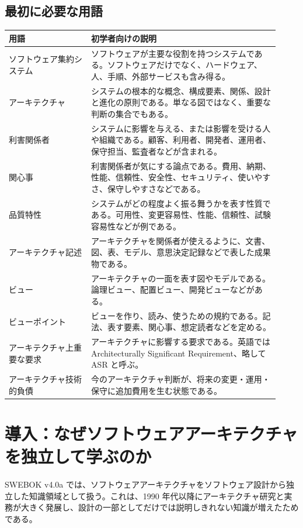 \documentclass[a4paper,11pt]{ltjsarticle}
\begin{document}
\subsection*{最初に必要な用語}
\begin{longtable}{P{0.28\linewidth}P{0.64\linewidth}}
\toprule
用語 & 初学者向けの説明 \\
\midrule
ソフトウェア集約システム & ソフトウェアが主要な役割を持つシステムである。ソフトウェアだけでなく、ハードウェア、人、手順、外部サービスも含み得る。 \\
アーキテクチャ & システムの根本的な概念、構成要素、関係、設計と進化の原則である。単なる図ではなく、重要な判断の集合でもある。 \\
利害関係者 & システムに影響を与える、または影響を受ける人や組織である。顧客、利用者、開発者、運用者、保守担当、監査者などが含まれる。 \\
関心事 & 利害関係者が気にする論点である。費用、納期、性能、信頼性、安全性、セキュリティ、使いやすさ、保守しやすさなどである。 \\
品質特性 & システムがどの程度よく振る舞うかを表す性質である。可用性、変更容易性、性能、信頼性、試験容易性などが例である。 \\
アーキテクチャ記述 & アーキテクチャを関係者が使えるように、文書、図、表、モデル、意思決定記録などで表した成果物である。 \\
ビュー & アーキテクチャの一面を表す図やモデルである。論理ビュー、配置ビュー、開発ビューなどがある。 \\
ビューポイント & ビューを作り、読み、使うための規約である。記法、表す要素、関心事、想定読者などを定める。 \\
アーキテクチャ上重要な要求 & アーキテクチャに影響する要求である。英語では Architecturally Significant Requirement、略して ASR と呼ぶ。 \\
アーキテクチャ技術的負債 & 今のアーキテクチャ判断が、将来の変更・運用・保守に追加費用を生む状態である。 \\
\bottomrule
\end{longtable}

\section*{導入：なぜソフトウェアアーキテクチャを独立して学ぶのか}
SWEBOK v4.0a では、ソフトウェアアーキテクチャをソフトウェア設計から独立した知識領域として扱う。これは、1990 年代以降にアーキテクチャ研究と実務が大きく発展し、設計の一部としてだけでは説明しきれない知識が増えたためである。
\end{document}
